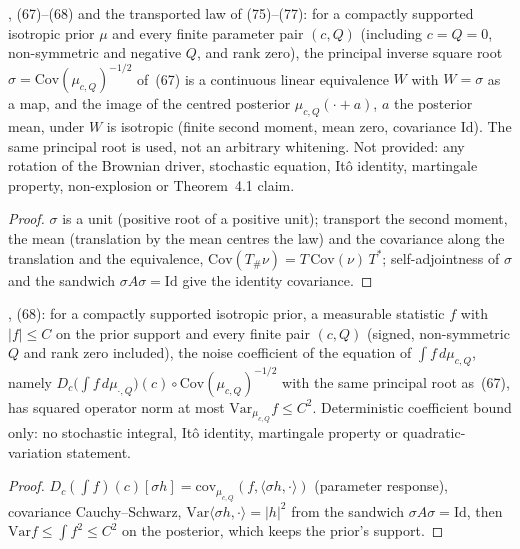 \begin{lemma}
  \label{lem:bkl-canonical-standardisation}
  \leanok
  \cite{BizeulKlartagLehec2026}, (67)--(68) and the transported law of (75)--(77): for a compactly supported
  isotropic prior $\mu$ and every finite parameter pair $(c,Q)$ (including $c=Q=0$, non-symmetric and negative
  $Q$, and rank zero), the principal inverse square root $\sigma=\mathrm{Cov}(\mu_{c,Q})^{-1/2}$ of~(67) is a
  continuous linear equivalence $W$ with $W=\sigma$ as a map, and the image of the centred posterior
  $\mu_{c,Q}(\cdot+a)$, $a$ the posterior mean, under $W$ is isotropic (finite second moment, mean zero,
  covariance $\mathrm{Id}$).  The same principal root is used, not an arbitrary whitening.  Not provided: any
  rotation of the Brownian driver, stochastic equation, It\^o identity, martingale property, non-explosion or
  Theorem~4.1 claim.
\end{lemma}
\begin{proof}
  \leanok
  $\sigma$ is a unit (positive root of a positive unit); transport the second moment, the mean (translation by
  the mean centres the law) and the covariance along the translation and the equivalence,
  $\mathrm{Cov}(T_\#\nu)=T\,\mathrm{Cov}(\nu)\,T^*$; self-adjointness of $\sigma$ and the sandwich
  $\sigma A\sigma=\mathrm{Id}$ give the identity covariance.
\end{proof}

\begin{lemma}
  \label{lem:bkl-noise-bound}
  \leanok
  \cite{BizeulKlartagLehec2026}, (68): for a compactly supported isotropic prior, a measurable statistic $f$ with
  $|f|\le C$ on the prior support and every finite pair $(c,Q)$ (signed, non-symmetric $Q$ and rank zero included),
  the noise coefficient of the equation of $\int f\,d\mu_{c,Q}$, namely $D_c\big(\int f\,d\mu_{\cdot,Q}\big)(c)\circ
  \mathrm{Cov}(\mu_{c,Q})^{-1/2}$ with the same principal root as~(67), has squared operator norm at most
  $\mathrm{Var}_{\mu_{c,Q}}f\le C^2$.  Deterministic coefficient bound only: no stochastic integral, It\^o identity,
  martingale property or quadratic-variation statement.
\end{lemma}
\begin{proof}
  \leanok
  $D_c(\int f)(c)[\sigma h]=\mathrm{cov}_{\mu_{c,Q}}(f,\langle\sigma h,\cdot\rangle)$ (parameter response),
  covariance Cauchy--Schwarz, $\mathrm{Var}\langle\sigma h,\cdot\rangle=|h|^2$ from the sandwich
  $\sigma A\sigma=\mathrm{Id}$, then $\mathrm{Var}f\le\int f^2\le C^2$ on the posterior, which keeps the prior's support.
\end{proof}

